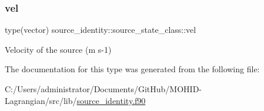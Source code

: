 \subsubsection{\texorpdfstring{vel}{vel}}
{\footnotesize\ttfamily type(vector) source\+\_\+identity\+::source\+\_\+state\+\_\+class\+::vel\hspace{0.3cm}{\ttfamily [private]}}



Velocity of the source (m s-\/1) 



The documentation for this type was generated from the following file\+:\begin{DoxyCompactItemize}
\item 
C\+:/\+Users/administrator/\+Documents/\+Git\+Hub/\+M\+O\+H\+I\+D-\/\+Lagrangian/src/lib/\mbox{\hyperlink{source__identity_8f90}{source\+\_\+identity.\+f90}}\end{DoxyCompactItemize}
